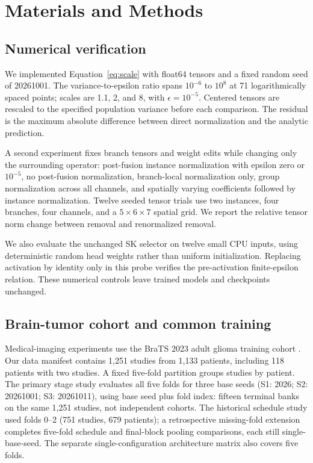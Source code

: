 \documentclass[mathematics,article,submit,pdftex,moreauthors]{Definitions/mdpi}
\begin{document}
\section{Materials and Methods}
\subsection{Numerical verification}
We implemented Equation~\eqref{eq:scale} with float64 tensors and a fixed
random seed of 20261001. The variance-to-epsilon ratio spans $10^{-6}$ to
$10^8$ at 71 logarithmically spaced points; scales are 1.1, 2, and 8, with
$\epsilon=10^{-5}$. Centered tensors are rescaled to the specified population
variance before each comparison. The residual is the maximum absolute
difference between direct normalization and the analytic prediction.

A second experiment fixes branch tensors and weight edits while changing
only the surrounding operator: post-fusion instance normalization with
epsilon zero or $10^{-5}$, no post-fusion normalization, branch-local
normalization only, group normalization across all channels, and spatially
varying coefficients followed by instance normalization. Twelve seeded
tensor trials use two instances, four branches, four channels, and a
$5\times6\times7$ spatial grid. We report the relative tensor norm change
between removal and renormalized removal.

We also evaluate the unchanged SK selector on twelve small CPU inputs,
using deterministic random head weights rather than uniform initialization.
Replacing activation by identity only in this probe verifies the
pre-activation finite-epsilon relation. These numerical controls leave trained
models and checkpoints unchanged.

\subsection{Brain-tumor cohort and common training}
Medical-imaging experiments use the BraTS 2023 adult glioma training cohort
\cite{bakas2023cluster,menze2015brats}. Our data manifest contains 1,251 studies
from 1,133 patients, including 118 patients with two studies. A fixed five-fold partition groups
studies by patient. The primary stage study evaluates all five folds for
three base seeds (S1: 2026; S2: 20261001; S3: 20261011), using base seed plus
fold index: fifteen terminal banks on the same 1,251 studies, not independent
cohorts. The historical schedule study used folds 0--2 (751 studies,
679 patients); a retrospective missing-fold extension completes five-fold
schedule and final-block pooling comparisons, each still single-base-seed.
The separate single-configuration architecture matrix also covers five folds.
\end{document}
